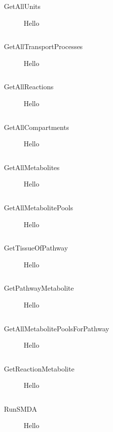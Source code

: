 \begin{description}

    \item[GetAllUnits] Hello

    \begin{lstlisting}
    \end{lstlisting}

    \item[GetAllTransportProcesses] Hello

    \begin{lstlisting}
    \end{lstlisting}

    \item[GetAllReactions] Hello

    \begin{lstlisting}
    \end{lstlisting}

    \item[GetAllCompartments] Hello

    \begin{lstlisting}
    \end{lstlisting}

    \item[GetAllMetabolites] Hello

    \begin{lstlisting}
    \end{lstlisting}

    \item[GetAllMetabolitePools] Hello

    \begin{lstlisting}
    \end{lstlisting}

    \item[GetTissueOfPathway] Hello

    \begin{lstlisting}
    \end{lstlisting}

    \item[GetPathwayMetabolite] Hello

    \begin{lstlisting}
    \end{lstlisting}

    \item[GetAllMetabolitePoolsForPathway] Hello

    \begin{lstlisting}
    \end{lstlisting}

    \item[GetReactionMetabolite] Hello

    \begin{lstlisting}
    \end{lstlisting}

    \item[RunSMDA] Hello

    \begin{lstlisting}
    \end{lstlisting}

\end{description}
